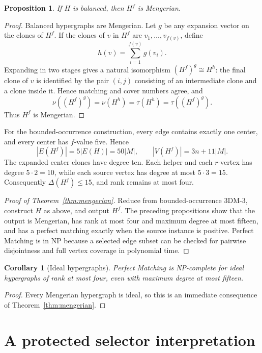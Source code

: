 \documentclass[11pt]{article}
\newtheorem{corollary}[theorem]{Corollary}
\newtheorem{proposition}[theorem]{Proposition}
\theoremstyle{definition}
\theoremstyle{remark}
\begin{document}
\begin{proposition}
If $H$ is balanced, then $H^f$ is Mengerian.
\end{proposition}

\begin{proof}
Balanced hypergraphs are Mengerian. Let $g$ be any expansion vector on the
clones of $H^f$. If the clones of $v$ in $H^f$ are
$v_1,\ldots,v_{f(v)}$, define
\[
h(v)=\sum_{i=1}^{f(v)}g(v_i).
\]
Expanding in two stages gives a natural isomorphism
$(H^f)^g\cong H^h$: the final clone of $v$ is identified by the pair
$(i,j)$ consisting of an intermediate clone and a clone inside it. Hence
matching and cover numbers agree, and
\[
\nu((H^f)^g)=\nu(H^h)=\tau(H^h)=\tau((H^f)^g).
\]
Thus $H^f$ is Mengerian.
\end{proof}

For the bounded-occurrence construction, every edge contains exactly one
center, and every center has $f$-value five. Hence
\[
|E(H^f)|=5|E(H)|=50|M|,
\qquad |V(H^f)|=3n+11|M|.
\]
The expanded center clones have degree ten. Each helper and each $r$-vertex
has degree $5\cdot2=10$, while each source vertex has degree at most
$5\cdot3=15$. Consequently $\Delta(H^f)\le15$, and rank remains at most
four.

\begin{proof}[Proof of Theorem~\ref{thm:mengerian}]
Reduce from bounded-occurrence 3DM-3, construct $H$ as above, and output
$H^f$. The preceding propositions show that the output is Mengerian, has
rank at most four and maximum degree at most fifteen, and has a perfect
matching exactly when the source instance is positive. Perfect Matching is
in NP because a selected edge subset can be checked for pairwise
disjointness and full vertex coverage in polynomial time.
\end{proof}

\begin{corollary}[Ideal hypergraphs]
Perfect Matching is NP-complete for ideal hypergraphs of rank at most four,
even with maximum degree at most fifteen.
\end{corollary}

\begin{proof}
Every Mengerian hypergraph is ideal, so this is an immediate consequence of
Theorem~\ref{thm:mengerian}.
\end{proof}

\section{A protected selector interpretation}
\end{document}
